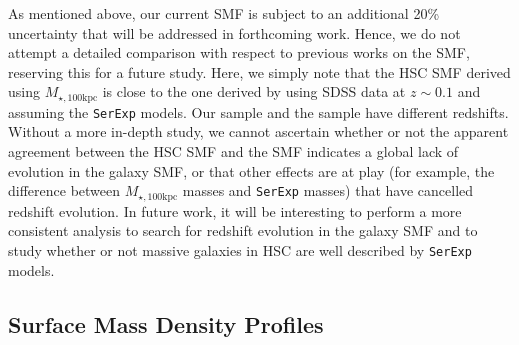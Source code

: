 \documentclass[a4paper,fleqn,usenatbib]{mnras}
\def\mstar{{$M_{\star}$}}
\def\mtot{{$M_{\star,100\mathrm{kpc}}$}}
\def\mmax{{$M_{\star,\mathrm{Max}}$}}
\def\mden{{$\mu_{\star}$}}
\begin{document}
    As mentioned above, our current SMF is subject to an additional 20\% uncertainty 
    that will be addressed in forthcoming work. 
    Hence, we do not attempt a detailed comparison with respect to previous works on 
    the SMF, reserving this for a future study. 
    Here, we simply note that the HSC SMF derived using \mtot{} is close to the one 
    derived by \citet{Bernardi2017} using SDSS data at $z{\sim}0.1$ and assuming 
    the \texttt{SerExp} models.  
    Our sample and the \citet{Bernardi2017} sample have different redshifts. 
    Without a more in-depth study, we cannot ascertain whether or not the apparent 
    agreement between the HSC SMF and the \citet{Bernardi2017} SMF indicates a global 
    lack of evolution in the galaxy SMF, or that other effects are at play 
    (for example, the difference between \mtot{} masses and \texttt{SerExp} masses) 
    that have cancelled redshift evolution.  
    In future work, it will be interesting to perform a more consistent analysis to 
    search for redshift evolution in the galaxy SMF and to study whether or not 
    massive galaxies in HSC are well described by \texttt{SerExp} models.
   
            
   
    
    
    

\subsection{Surface Mass Density Profiles}
    \label{ssec:sbp_compare}
\end{document}
